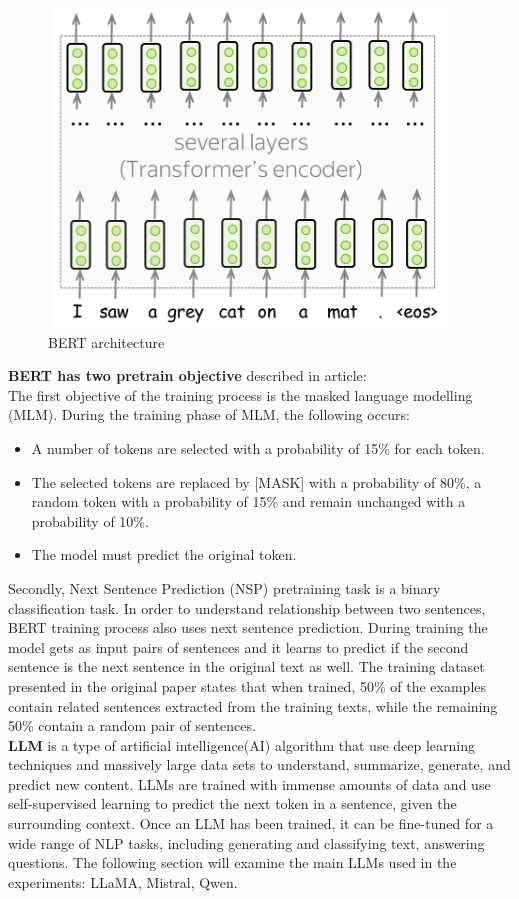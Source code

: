 \documentclass[PMI,VKR]{HSEUniversity}
\begin{document}
\begin{figure}[h]
    \centering
    \includegraphics[scale=0.8]{img/bert.png}
    \caption{BERT architecture}
\end{figure}

\textbf{BERT has two pretrain objective} described in article: \\
The first objective of the training process is the masked language modelling (MLM). 
During the training phase of MLM, the following occurs:

\begin{itemize}
    \item A number of tokens are selected with a probability of 15\% for each token.
    \item The selected tokens are replaced by [MASK] with a probability of 80\%, a random token with a probability of 15\% and remain unchanged with a probability of 10\%.
    \item The model must predict the original token.
\end{itemize}

Secondly, Next Sentence Prediction (NSP) pretraining task is a binary classification task. 
In order to understand relationship between two sentences, BERT training process also uses next sentence prediction.
During training the model gets as input pairs of sentences and it learns to predict if the second sentence is the next sentence in the original text as well. 
The training dataset presented in the original paper states that when trained, 50\% of the examples contain related sentences extracted from the training texts, while the remaining 50\% contain a random pair of sentences.\\


\textbf{LLM} is a type of artificial intelligence(AI) algorithm that use deep learning techniques and massively large data sets to understand, summarize, generate, and predict new content. 
LLMs are trained with immense amounts of data and use self-supervised learning to predict the next token in a sentence, given the surrounding context. 
Once an LLM has been trained, it can be fine-tuned for a wide range of NLP tasks, including generating and classifying text, answering questions.
The following section will examine the main LLMs used in the experiments: LLaMA, Mistral, Qwen.
\end{document}
